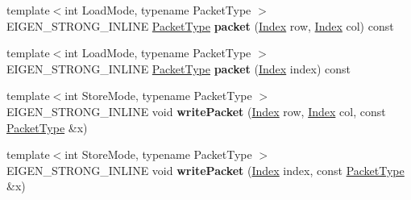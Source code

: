 \begin{DoxyCompactItemize}
\item 
\mbox{\label{struct_eigen_1_1internal_1_1mapbase__evaluator_afb33856cd493fbdffb2f57915dcd8888}} 
{\footnotesize template$<$int Load\+Mode, typename Packet\+Type $>$ }\\E\+I\+G\+E\+N\+\_\+\+S\+T\+R\+O\+N\+G\+\_\+\+I\+N\+L\+I\+NE \hyperlink{struct_eigen_1_1_packet_type}{Packet\+Type} {\bfseries packet} (\hyperlink{namespace_eigen_a62e77e0933482dafde8fe197d9a2cfde}{Index} row, \hyperlink{namespace_eigen_a62e77e0933482dafde8fe197d9a2cfde}{Index} col) const
\item 
\mbox{\label{struct_eigen_1_1internal_1_1mapbase__evaluator_a783c32aa529b4b3085190eef66fb2039}} 
{\footnotesize template$<$int Load\+Mode, typename Packet\+Type $>$ }\\E\+I\+G\+E\+N\+\_\+\+S\+T\+R\+O\+N\+G\+\_\+\+I\+N\+L\+I\+NE \hyperlink{struct_eigen_1_1_packet_type}{Packet\+Type} {\bfseries packet} (\hyperlink{namespace_eigen_a62e77e0933482dafde8fe197d9a2cfde}{Index} index) const
\item 
\mbox{\label{struct_eigen_1_1internal_1_1mapbase__evaluator_a4b7f13fced92d667256c097caccfba90}} 
{\footnotesize template$<$int Store\+Mode, typename Packet\+Type $>$ }\\E\+I\+G\+E\+N\+\_\+\+S\+T\+R\+O\+N\+G\+\_\+\+I\+N\+L\+I\+NE void {\bfseries write\+Packet} (\hyperlink{namespace_eigen_a62e77e0933482dafde8fe197d9a2cfde}{Index} row, \hyperlink{namespace_eigen_a62e77e0933482dafde8fe197d9a2cfde}{Index} col, const \hyperlink{struct_eigen_1_1_packet_type}{Packet\+Type} \&x)
\item 
\mbox{\label{struct_eigen_1_1internal_1_1mapbase__evaluator_ad86d8fc9ce0db49235ab5c80ba380ab1}} 
{\footnotesize template$<$int Store\+Mode, typename Packet\+Type $>$ }\\E\+I\+G\+E\+N\+\_\+\+S\+T\+R\+O\+N\+G\+\_\+\+I\+N\+L\+I\+NE void {\bfseries write\+Packet} (\hyperlink{namespace_eigen_a62e77e0933482dafde8fe197d9a2cfde}{Index} index, const \hyperlink{struct_eigen_1_1_packet_type}{Packet\+Type} \&x)
\item 
\mbox{\label{struct_eigen_1_1internal_1_1mapbase__evaluator_adeebd40502dff8fa523e7c17aa06abb2}} 

\end{DoxyCompactItemize}
